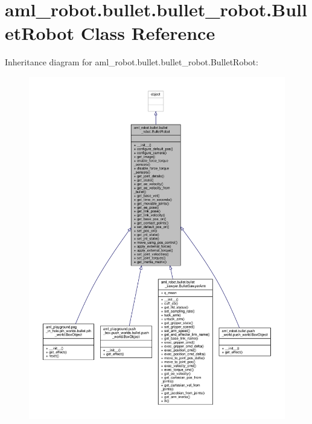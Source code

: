 \hypertarget{classaml__robot_1_1bullet_1_1bullet__robot_1_1_bullet_robot}{\section{aml\-\_\-robot.\-bullet.\-bullet\-\_\-robot.\-Bullet\-Robot Class Reference}
\label{classaml__robot_1_1bullet_1_1bullet__robot_1_1_bullet_robot}
}


Inheritance diagram for aml\-\_\-robot.\-bullet.\-bullet\-\_\-robot.\-Bullet\-Robot\-:\nopagebreak
\begin{figure}[H]
\begin{center}
\leavevmode
\includegraphics[width=350pt]{classaml__robot_1_1bullet_1_1bullet__robot_1_1_bullet_robot__inherit__graph}
\end{center}
\end{figure}


